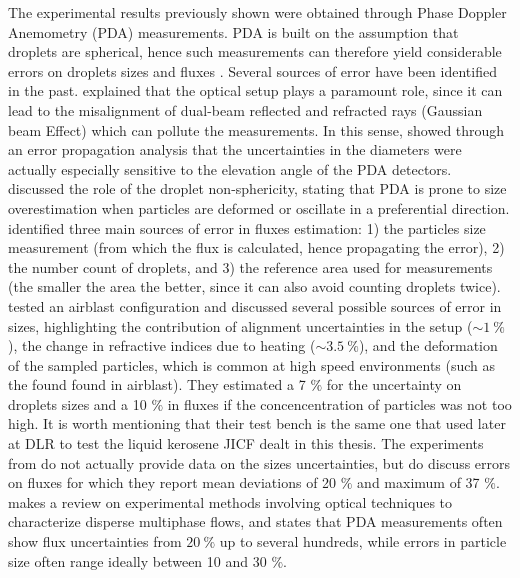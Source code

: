 The experimental results previously shown were obtained through Phase Doppler Anemometry (PDA) measurements. PDA is built on the assumption that droplets are spherical, hence such measurements can therefore yield considerable errors on droplets sizes and fluxes . Several sources of error have been identified in the past.  explained that the optical setup plays a paramount role, since it can lead to the misalignment of dual-beam reflected and refracted rays (Gaussian beam Effect) which can pollute the measurements. In this sense,  showed through an error propagation analysis that the uncertainties in the diameters were actually especially sensitive to the elevation angle of the PDA detectors.  discussed the role of the droplet non-sphericity, stating that PDA is prone to size overestimation when particles are deformed or oscillate in a preferential direction.  identified three main sources of error in fluxes estimation: 1) the particles size measurement (from which the flux is calculated, hence propagating the error), 2) the number count of droplets, and 3) the reference area used for measurements (the smaller the area the better, since it can also avoid counting droplets twice).  tested an airblast configuration and discussed several possible sources of error in sizes, highlighting the contribution of alignment uncertainties in the setup ($\sim 1~\%$), the change in refractive indices due to heating ($\sim 3.5~\%$), and the deformation of the sampled particles, which is common at high speed environments (such as the found found in airblast). They estimated a 7 $\%$ for the uncertainty on droplets sizes and a 10 $\%$ in fluxes if the concencentration of particles was not too high. It is worth mentioning that their test bench is the same one that   used later at DLR to test the liquid kerosene JICF dealt in this thesis. The experiments from  do not actually provide data on the sizes uncertainties, but do discuss errors on fluxes for which they report mean deviations of 20 $\%$ and maximum of 37 $\%$.  makes a review on experimental methods involving optical techniques to characterize disperse multiphase flows, and states that PDA measurements often show flux uncertainties from $20~\%$ up to several hundreds, while errors in particle size often range ideally between 10 and 30 $\%$. 

